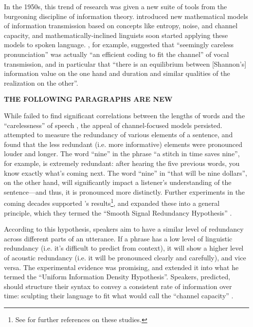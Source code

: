 \documentclass[12pt,twoside]{article}
\begin{document}
In the 1950s, this trend of research was given a new suite of tools from the burgeoning discipline of information theory. \citet{shannon} introduced new mathematical models of information transmission based on concepts like entropy, noise, and channel capacity, and mathematically-inclined linguists soon started applying these models to spoken language. \citet[674,676]{karlgren}, for example, suggested that ``seemingly careless pronunciation'' was actually ``an efficient coding to fit the channel'' of vocal transmission, and in particular that ``there is an equilibrium between [Shannon's] information value on the one hand and duration and similar qualities of the realization on the other''.

\textbf{THE FOLLOWING PARAGRAPHS ARE NEW}

While \citeauthor{karlgren} failed to find significant correlations between the lengths of words and the ``carelessness'' of speech \citep{karlgren}, the appeal of channel-focused models persisted. \citet{lieberman} attempted to measure the redundancy of various elements of a sentence, and found that the less redundant (i.e. more informative) elements were pronounced louder and longer. The word ``nine'' in the phrase ``a stitch in time saves nine'', for example, is extremely redundant: after hearing the five previous words, you know exactly what's coming next. The word ``nine'' in ``that will be nine dollars'', on the other hand, will significantly impact a listener's understanding of the sentence---and thus, it is pronounced more distinctly. Further experiments in the coming decades supported \citeauthor{lieberman}'s results\footnote{See \cite[32]{aylett} for further references on these studies.\citereset}, and \citet{aylett} expanded these into a general principle, which they termed the ``Smooth Signal Redundancy Hypothesis'' \citep[34]{aylett}.

According to this hypothesis, speakers aim to have a similar level of redundancy across different parts of an utterance. If a phrase has a low level of linguistic redundancy (i.e. it's difficult to predict from context), it will show a higher level of acoustic redundancy (i.e. it will be pronounced clearly and carefully), and vice versa. The experimental evidence was promising, and \citet{jaeger} extended it into what he termed the ``Uniform Information Density Hypothesis''. Speakers, \citeauthor{jaeger} predicted, should structure their syntax to convey a consistent rate of information over time: sculpting their language to fit what \citet{shannon} would call the ``channel capacity'' \citep[3]{jaeger}.
\end{document}
